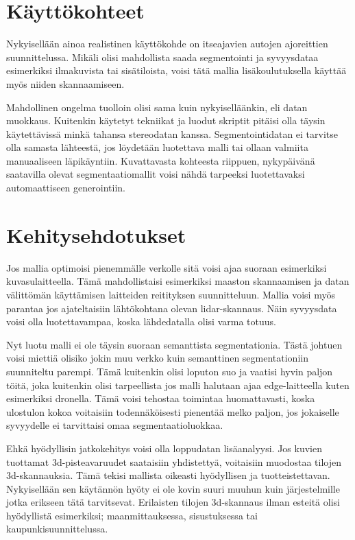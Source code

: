 \section{Käyttökohteet}

Nykyisellään ainoa realistinen käyttökohde on itseajavien autojen ajoreittien suunnittelussa.
Mikäli olisi mahdollista saada segmentointi ja syvyysdataa esimerkiksi ilmakuvista tai sisätiloista, voisi tätä mallia lisäkoulutuksella käyttää myös niiden skannaamiseen.

Mahdollinen ongelma tuolloin olisi sama kuin nykyiselläänkin, eli datan muokkaus.
Kuitenkin käytetyt tekniikat ja luodut skriptit pitäisi olla täysin käytettävissä minkä tahansa stereodatan kanssa.
Segmentointidatan ei tarvitse olla samasta lähteestä, jos löydetään luotettava malli tai ollaan valmiita manuaaliseen läpikäyntiin.
Kuvattavasta kohteesta riippuen, nykypäivänä saatavilla olevat segmentaatiomallit voisi nähdä tarpeeksi luotettavaksi automaattiseen generointiin.

\section{Kehitysehdotukset}


Jos mallia optimoisi pienemmälle verkolle sitä voisi ajaa suoraan esimerkiksi kuvasulaitteella.
Tämä mahdollistaisi esimerkiksi maaston skannaamisen ja datan välittömän käyttämisen laitteiden reitityksen suunnitteluun.
Mallia voisi myös parantaa jos ajateltaisiin lähtökohtana olevan lidar-skannaus.
Näin syvyysdata voisi olla luotettavampaa, koska lähdedatalla olisi varma totuus. 

Nyt luotu malli ei ole täysin suoraan semanttista segmentationia.
Tästä johtuen voisi miettiä olisiko jokin muu verkko kuin semanttinen segmentationiin suunniteltu parempi.
Tämä kuitenkin olisi loputon suo ja vaatisi hyvin paljon töitä,
joka kuitenkin olisi tarpeellista jos malli halutaan ajaa edge-laitteella kuten esimerkiksi dronella. 
Tämä voisi tehostaa toimintaa huomattavasti, koska ulostulon kokoa voitaisiin todennäköisesti pienentää melko paljon, jos jokaiselle syvyydelle ei tarvittaisi omaa segmentaatioluokkaa.

Ehkä hyödyllisin jatkokehitys voisi olla loppudatan lisäanalyysi.
Jos kuvien tuottamat 3d-pisteavaruudet saataisiin yhdistettyä, voitaisiin muodostaa tilojen 3d-skannauksia.
Tämä tekisi mallista oikeasti hyödyllisen ja tuotteistettavan.
Nykyisellään sen käytännön hyöty ei ole kovin suuri muuhun kuin järjestelmille jotka erikseen tätä tarvitsevat.
Erilaisten tilojen 3d-skannaus ilman esteitä olisi hyödyllistä esimerkiksi; maanmittauksessa, sisustuksessa tai kaupunkisuunnittelussa.

